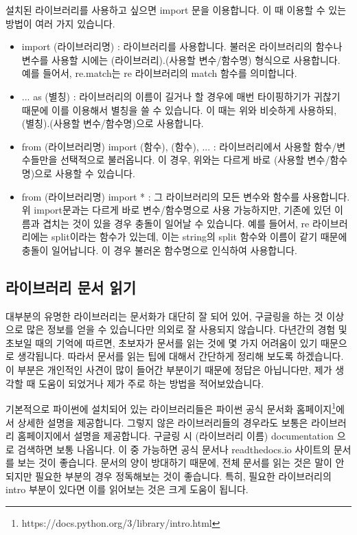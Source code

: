 \documentclass[twoside]{article}
\begin{document}
설치된 라이브러리를 사용하고 싶으면 import 문을 이용합니다. 이 때 이용할 수 있는 방법이 여러 가지 있습니다. 

\begin{itemize} 
\item import (라이브러리명) : 라이브러리를 사용합니다. 불러온 라이브러리의 함수나 변수를 사용할 시에는 (라이브러리).(사용할 변수/함수명) 형식으로 사용합니다. 예를 들어서, re.match는 re 라이브러리의 match 함수를 의미합니다. 
\item ... as (별칭) : 라이브러리의 이름이 길거나 할 경우에 매번 타이핑하기가 귀찮기 때문에 이를 이용해서 별칭을 쓸 수 있습니다. 이 때는 위와 비슷하게 사용하되, (별칭).(사용할 변수/함수명)으로 사용합니다. 
\item from (라이브러리명) import (함수), (함수), ... : 라이브러리에서 사용할 함수/변수들만을 선택적으로 불러옵니다. 이 경우, 위와는 다르게 바로 (사용할 변수/함수명)으로 사용할 수 있습니다. 
\item from (라이브러리명) import * : 그 라이브러리의 모든 변수와 함수를 사용합니다. 위 import문과는 다르게 바로 변수/함수명으로 사용 가능하지만, 기존에 있던 이름과 겹치는 것이 있을 경우 충돌이 일어날 수 있습니다. 예를 들어서, re 라이브러리에는 split이라는 함수가 있는데, 이는 string의 split 함수와 이름이 같기 때문에 충돌이 일어납니다. 이 경우 불러온 함수명으로 인식하여 사용합니다. 
\end{itemize}

\subsection{라이브러리 문서 읽기}

대부분의 유명한 라이브러리는 문서화가 대단히 잘 되어 있어, 구글링을 하는 것 이상으로 많은 정보를 얻을 수 있습니다만 의외로 잘 사용되지 않습니다. 다년간의 경험 및 초보일 때의 기억에 따르면, 초보자가 문서를 읽는 것에 몇 가지 어려움이 있기 때문으로 생각됩니다. 따라서 문서를 읽는 팁에 대해서 간단하게 정리해 보도록 하겠습니다. 이 부분은 개인적인 사견이 많이 들어간 부분이기 때문에 정답은 아닙니다만, 제가 생각할 때 도움이 되었거나 제가 주로 하는 방법을 적어보았습니다. 

기본적으로 파이썬에 설치되어 있는 라이브러리들은 파이썬 공식 문서화 홈페이지\footnote{https://docs.python.org/3/library/intro.html}에서 상세한 설명을 제공합니다. 
그렇지 않은 라이브러리들의 경우라도 보통은 라이브러리 홈페이지에서 설명을 제공합니다. 구글링 시 (라이브러리 이름) documentation 으로 검색하면 보통 나옵니다. 이 중 가능하면 공식 문서나 readthedocs.io 사이트의 문서를 보는 것이 좋습니다. 문서의 양이 방대하기 때문에, 전체 문서를 읽는 것은 말이 안되지만 필요한 부분의 경우 정독해보는 것이 좋습니다. 특히, 필요한 라이브러리의 intro 부분이 있다면 이를 읽어보는 것은 크게 도움이 됩니다. 
\end{document}
